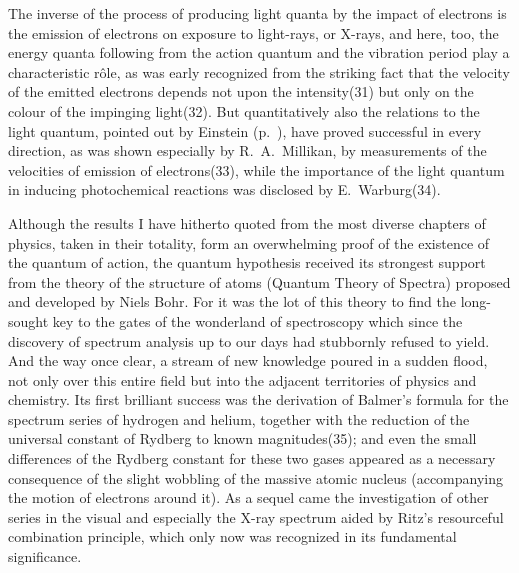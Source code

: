 \documentclass[12pt,oneside]{book}
\begin{document}
The inverse of the process of producing light quanta by
the impact of electrons is the emission of electrons on
exposure to light-rays, or X-rays, and here, too, the energy
quanta following from the action quantum and the vibration
period play a characteristic r\^{o}le, as was early recognized
from the striking fact that the velocity of the emitted
electrons depends not upon the intensity(31) but only on
the colour of the impinging light(32). But quantitatively
also the relations to the light quantum, pointed out by
Einstein (p.~\pageref{Einstein}), %
have proved successful in every direction,
as was shown especially by R.~A.~Millikan, by measurements
of the velocities of emission of electrons(33), while
the importance of the light quantum in inducing photochemical
reactions was disclosed by E.~Warburg(34).

Although the results I have hitherto quoted from the most
diverse chapters of physics, taken in their totality, form an
overwhelming proof of the existence of the quantum of
action, the quantum hypothesis received its strongest support
from the theory of the structure of atoms (Quantum
Theory of Spectra) proposed and developed by Niels Bohr.
For it was the lot of this theory to find the long-sought key
to the gates of the wonderland of spectroscopy which since
the discovery of spectrum analysis up to our days had stubbornly
refused to yield. And the way once clear, a stream
of new knowledge poured in a sudden flood, not only over
this entire field but into the adjacent territories of physics
and chemistry. Its first brilliant success was the derivation
of Balmer's formula for the spectrum series of hydrogen and
helium, together with the reduction of the universal constant
of Rydberg to known magnitudes(35); and even the
small differences of the Rydberg constant for these two
gases appeared as a necessary consequence of the slight
wobbling of the massive atomic nucleus (accompanying the
motion of electrons around it). As a sequel came the
investigation of other series in the visual and especially
the X-ray spectrum aided by Ritz's resourceful combination
principle, which only now was recognized in its fundamental
significance.
\end{document}
